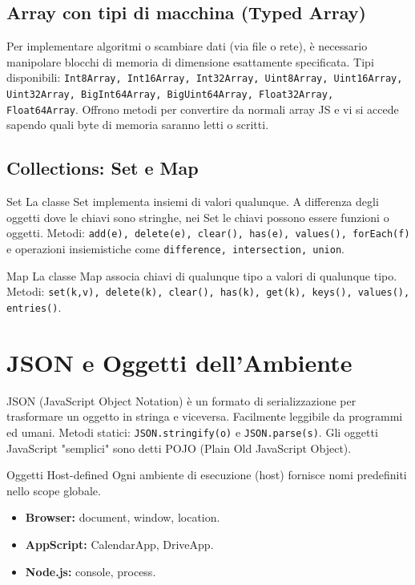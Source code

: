 \subsection{Array con tipi di macchina (Typed Array)}
Per implementare algoritmi o scambiare dati (via file o rete), è necessario manipolare blocchi di memoria di dimensione esattamente specificata. Tipi disponibili: \texttt{Int8Array, Int16Array, Int32Array, Uint8Array, Uint16Array, Uint32Array, BigInt64Array, BigUint64Array, Float32Array, Float64Array}. Offrono metodi per convertire da normali array JS e vi si accede sapendo quali byte di memoria saranno letti o scritti.

\subsection{Collections: Set e Map}
\begin{definition}{Set}
La classe Set implementa insiemi di valori qualunque. A differenza degli oggetti dove le chiavi sono stringhe, nei Set le chiavi possono essere funzioni o oggetti. Metodi: \texttt{add(e), delete(e), clear(), has(e), values(), forEach(f)} e operazioni insiemistiche come \texttt{difference, intersection, union}.
\end{definition}

\begin{definition}{Map}
La classe Map associa chiavi di qualunque tipo a valori di qualunque tipo. Metodi: \texttt{set(k,v), delete(k), clear(), has(k), get(k), keys(), values(), entries()}.
\end{definition}

\section{JSON e Oggetti dell'Ambiente}
JSON (JavaScript Object Notation) è un formato di serializzazione per trasformare un oggetto in stringa e viceversa. Facilmente leggibile da programmi ed umani. Metodi statici: \texttt{JSON.stringify(o)} e \texttt{JSON.parse(s)}. Gli oggetti JavaScript "semplici" sono detti POJO (Plain Old JavaScript Object).

\begin{definition}{Oggetti Host-defined}
Ogni ambiente di esecuzione (host) fornisce nomi predefiniti nello scope globale.
\begin{itemize}
    \item \textbf{Browser:} document, window, location.
    \item \textbf{AppScript:} CalendarApp, DriveApp.
    \item \textbf{Node.js:} console, process.
\end{itemize}
\end{definition}

